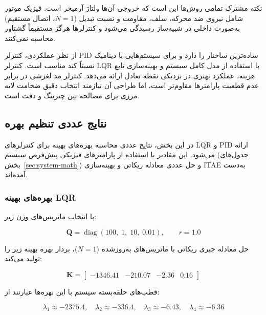 نکته مشترک تمامی روش‌ها این است که خروجی آن‌ها ولتاژ آرمیچر است. فیزیک موتور شامل نیروی ضد محرکه، سلف، مقاومت و نسبت تبدیل ($N=1$، اتصال مستقیم) به‌صورت داخلی در شبیه‌ساز رسیدگی می‌شود و کنترلرها هرگز مستقیماً گشتاور محاسبه نمی‌کنند.

از نظر عملکردی، کنترلر PID ساده‌ترین ساختار را دارد و برای سیستم‌هایی با دینامیک نسبتاً کند مناسب است. کنترلر LQR با استفاده از مدل کامل سیستم و بهینه‌سازی تابع هزینه، عملکرد بهتری در نزدیکی نقطه تعادل ارائه می‌دهد. کنترلر مد لغزشی در برابر عدم قطعیت پارامترها مقاوم‌تر است، اما طراحی آن نیازمند انتخاب دقیق ضخامت لایه مرزی برای مصالحه بین چترینگ و دقت است.

\subsection{نتایج عددی تنظیم بهره}
\label{sec:gain-results}

در این بخش، نتایج عددی محاسبه بهره‌های بهینه برای کنترلرهای LQR و PID ارائه می‌شود. این مقادیر با استفاده از پارامترهای فیزیکی پیش‌فرض سیستم (جدول‌های بخش~\ref{sec:system-math}) و حل عددی معادله ریکاتی و بهینه‌سازی ITAE به‌دست آمده‌اند.

\subsubsection{بهره‌های بهینه LQR}

با انتخاب ماتریس‌های وزن زیر:

\begin{equation}
\mathbf{Q} = \operatorname{diag}(100,\; 1,\; 10,\; 0.01), \qquad r = 1.0
\end{equation}

حل معادله جبری ریکاتی با ماتریس‌های به‌روز‌شده ($N=1$)، بردار بهره بهینه زیر را تولید می‌کند:

\begin{equation}
\mathbf{K} = \begin{bmatrix} -1346.41 & -210.07 & -2.36 & 0.16 \end{bmatrix}
\end{equation}

قطب‌های حلقه‌بسته سیستم با این بهره‌ها عبارتند از:

\begin{equation}
\lambda_1 \approx -2375.4, \quad \lambda_2 \approx -336.4, \quad \lambda_3 \approx -6.43, \quad \lambda_4 \approx -6.36
\end{equation}


